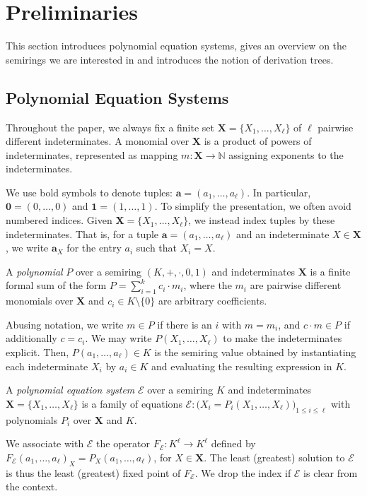 \documentclass[english,runningheads,a4paper,envcountsame]{llncs}
\newenvironment{Definition}{\definition\upshape}{\enddefinition}
\newcommand{\Nat}{\mathbb{N}}
\newcommand*{\XX}{{\bm X}}
\newcommand*{\EE}{\mathcal{E}}
\newcommand*{\co}{\colon}
\newcommand*{\tup}[1]{\mathbf{#1}}
\begin{document}
\section{Preliminaries}

This section introduces polynomial equation systems, gives an overview on the semirings we are interested in and introduces the notion of derivation trees.


\subsection{Polynomial Equation Systems}

Throughout the paper, we always fix a finite set $\XX = \{ X_1,\dots,X_\ell\}$ of $\ell$ pairwise different indeterminates.
A monomial over $\XX$ is a product of powers of indeterminates, represented as mapping $m \co \XX \to \Nat$ assigning exponents to the indeterminates.

We use bold symbols to denote tuples: $\tup a = (a_1, \dots, a_\ell)$.
In particular, $\tup 0 = (0, \dots, 0)$ and $\tup 1 = (1, \dots, 1)$.
To simplify the presentation, we often avoid numbered indices.
Given $\XX = \{ X_1, \dots, X_\ell \}$, we instead index tuples by these indeterminates.
That is, for a tuple $\tup a = (a_1,\dots,a_\ell)$ and an indeterminate $X \in \XX$, we write $\tup a_X$ for the entry $a_i$ such that $X_i = X$.


\begin{Definition}\label{defPolynomial}
A \emph{polynomial} $P$ over a semiring $(K,+,\cdot,0,1)$ and indeterminates $\XX$ is a finite formal sum of the form $P = \sum_{i=1}^k c_i \cdot m_i$, where the $m_i$ are pairwise different monomials over $\XX$ and $c_i \in K \setminus \{0\}$ are arbitrary coefficients.

Abusing notation, we write $m \in P$ if there is an $i$ with $m = m_i$, and $c \cdot m \in P$ if additionally $c = c_i$.
We may write $P(X_1,\dots,X_\ell)$ to make the indeterminates explicit.
Then, $P(a_1,\dots,a_\ell) \in K$ is the semiring value obtained by instantiating each indeterminate $X_i$ by $a_i \in K$ and evaluating the resulting expression in $K$.
\end{Definition}

\begin{Definition}\label{defEquationSystem}
A \emph{polynomial equation system} $\EE$ over a semiring $K$ and indeterminates $\XX = \{X_1,\dots,X_\ell\}$ is a family of equations $\EE \co \big(X_i = P_i(X_1,\dots,X_\ell)\big)_{1 \le i \le \ell}$
with polynomials $P_i$ over $\XX$ and $K$.

We associate with $\EE$ the operator $F_\EE \co K^\ell \to K^\ell$ defined by $F_\EE(a_1,\dots,a_\ell)_X = P_X(a_1,\dots,a_\ell)$, for $X \in \XX$.
The least (greatest) solution to $\EE$ is thus the least (greatest) fixed point of $F_\EE$.
We drop the index if $\EE$ is clear from the context.
\end{Definition}
\end{document}
